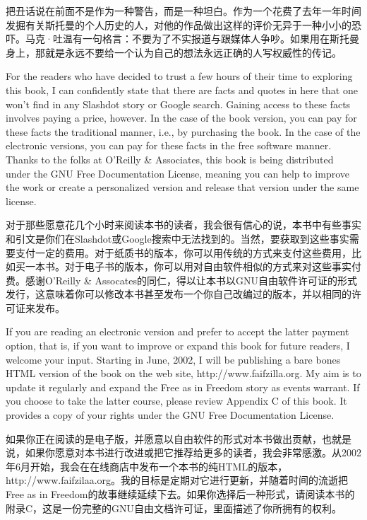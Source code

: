 \ifdefined\chs
把丑话说在前面不是作为一种警告，而是一种坦白。作为一个花费了去年一年时间发掘有关斯托曼的个人历史的人，对他的作品做出这样的评价无异于一种小小的恐吓。马克·吐温有一句格言：不要为了不实报道与跟媒体人争吵。如果用在斯托曼身上，那就是永远不要给一个认为自己的想法永远正确的人写权威性的传记。
\fi

\ifdefined\eng
For the readers who have decided to trust a few hours of their time to exploring this book, I can confidently state that there are facts and quotes in here that one won't find in any Slashdot story or Google search. Gaining access to these facts involves paying a price, however. In the case of the book version, you can pay for these facts the traditional manner, i.e., by purchasing the book. In the case of the electronic versions, you can pay for these facts in the free software manner. Thanks to the folks at O'Reilly \& Associates, this book is being distributed under the GNU Free Documentation License, meaning you can help to improve the work or create a personalized version and release that version under the same license.
\fi

\ifdefined\chs
对于那些愿意花几个小时来阅读本书的读者，我会很有信心的说，本书中有些事实和引文是你们在Slashdot或Google搜索中无法找到的。当然，要获取到这些事实需要支付一定的费用。对于纸质书的版本，你可以用传统的方式来支付这些费用，比如买一本书。对于电子书的版本，你可以用对自由软件相似的方式来对这些事实付费。感谢O'Reilly \& Assocates的同仁，得以让本书以GNU自由软件许可证的形式发行，这意味着你可以修改本书甚至发布一个你自己改编过的版本，并以相同的许可证来发布。
\fi

\ifdefined\eng
If you are reading an electronic version and prefer to accept the latter payment option, that is, if you want to improve or expand this book for future readers, I welcome your input. Starting in June, 2002, I will be publishing a bare bones HTML version of the book on the web site, http://www.faifzilla.org. My aim is to update it regularly and expand the Free as in Freedom story as events warrant. If you choose to take the latter course, please review Appendix C of this book. It provides a copy of your rights under the GNU Free Documentation License.
\fi

\ifdefined\chs
如果你正在阅读的是电子版，并愿意以自由软件的形式对本书做出贡献，也就是说，如果你愿意对本书进行改进或把它推荐给更多的读者，我会非常感激。从2002年6月开始，我会在在线商店中发布一个本书的纯HTML的版本，http://www.faifzilaa.org。我的目标是定期对它进行更新，并随着时间的流逝把Free as in Freedom的故事继续延续下去。如果你选择后一种形式，请阅读本书的附录C，这是一份完整的GNU自由文档许可证，里面描述了你所拥有的权利。
\fi

